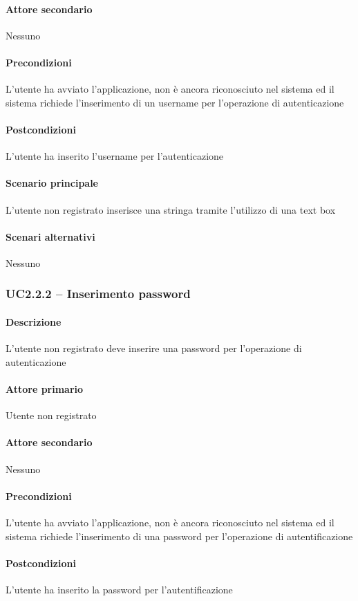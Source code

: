 \paragraph{Attore secondario}  Nessuno
\paragraph{Precondizioni}  L’utente ha avviato l’applicazione, non è ancora riconosciuto nel sistema ed il sistema richiede l’inserimento di un username per l’operazione di autenticazione
\paragraph{Postcondizioni}  L’utente ha inserito l’username per l’autenticazione
\paragraph{Scenario principale}  
L’utente non registrato inserisce una stringa tramite l’utilizzo di una text box
\paragraph{Scenari alternativi}  Nessuno



\subsubsection{UC2.2.2 – Inserimento password}
\paragraph{Descrizione}  L’utente non registrato deve inserire una password per l’operazione di autenticazione
\paragraph{Attore primario}  Utente non registrato
\paragraph{Attore secondario}  Nessuno
\paragraph{Precondizioni}  L’utente ha avviato l’applicazione, non è ancora riconosciuto nel sistema ed il sistema richiede l’inserimento di una password per l’operazione di autentificazione
\paragraph{Postcondizioni}  L’utente ha inserito la password per l’autentificazione

